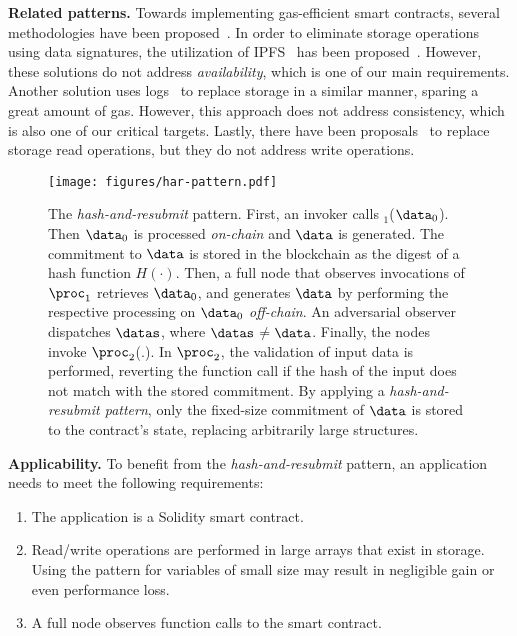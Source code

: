 \noindent \textbf{Related patterns.} Towards implementing gas-efficient smart
contracts, several
methodologies have been proposed~\cite{contract-opt-1,contract-opt-2,slither,madmax}.
In order to eliminate storage operations
using data signatures, the utilization of IPFS~\cite{ipfs} has been
proposed~\cite{ipfs-1,ipfs-2}. However, these solutions do not address
\emph{availability}, which is one of our main requirements. Another solution
uses logs~\cite{logs} to replace storage in a similar manner, sparing a great
amount of gas. However, this approach does not address consistency, which is
also one of our critical targets. Lastly, there have been proposals~\cite{memory-array}
to replace storage read operations, but they do not address write operations.

\ifconference\else
\begin{landscape}\centering
\fi
\vspace*{\fill}
\begin{figure*}
    \centering
    \texttt{[image: figures/har-pattern.pdf]}

    \caption{The \emph{hash-and-resubmit} pattern. First, an invoker calls
        \proc$_1$($\data_0$). Then $\data_0$ is processed \emph{on-chain} and
        $\data$ is generated. The commitment to $\data$ is stored in the
        blockchain as the digest of a hash function $H(\cdot)$. Then,
        a full node that observes invocations of $\proc_1$ retrieves $\data_0$,
        and generates $\data$ by performing the respective processing on
        $\data_0$ \emph{off-chain}. An adversarial observer dispatches
        $\datas$, where $\datas$$\neq$$\data$. Finally, the nodes invoke
        $\proc_2$(.). In $\proc_2$, the validation of input data is performed,
        reverting the function call if the hash of the input does not
        match with the stored commitment. By applying
        a \emph{hash-and-resubmit pattern}, only the fixed-size commitment of
        $\data$ is stored to the contract's state, replacing arbitrarily large
        structures.}

        \label{fig:har-pattern}
\end{figure*}
\vfill
\ifconference\else
\end{landscape}
\fi

\noindent
\textbf{Applicability.}
To benefit from the \emph{hash-and-resubmit} pattern, an application needs to
meet the following requirements:

\begin{enumerate}
    \item The application is a Solidity smart contract.
    \item Read/write operations are performed in large arrays that exist in
        storage. Using the pattern for variables of small size may result in
        negligible gain or even performance loss.
    \item A full node observes function calls to the smart contract.
\end{enumerate}

